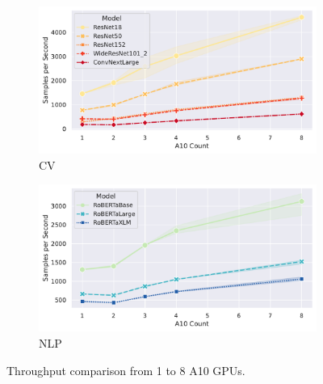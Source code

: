 \begin{figure}
    \begin{subfigure}[c]{0.23\textwidth}
        \includegraphics[width=\textwidth]{figures/misc/cv_multi-a10_scalability}
        \vspace{-18pt}
        \caption{CV}
        \label{fig:cv-multi-a10}
    \end{subfigure}
    \begin{subfigure}[c]{0.23\textwidth}
        \includegraphics[width=\textwidth]{figures/misc/nlp_multi-a10_scalability}
        \vspace{-18pt}
        \caption{NLP}
        \label{fig:nlp-multi-a10}  
    \end{subfigure}
    \vspace{-10pt}
	\caption{Throughput comparison from 1 to 8 A10 GPUs.}
	\label{fig:multi-a10}
\end{figure}

